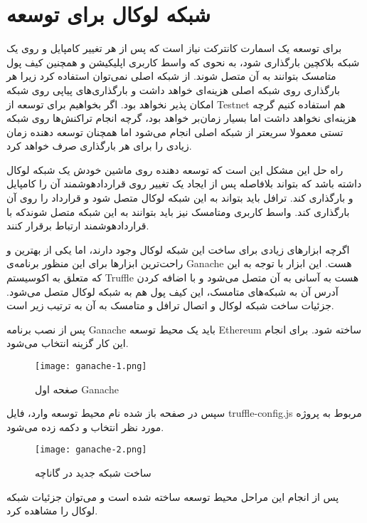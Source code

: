 \section{شبکه لوکال برای توسعه}
برای توسعه یک اسمارت کانترکت نیاز است که پس از هر تغییر کامپایل و روی یک شبکه بلاکچین بارگذاری شود، به نحوی که واسط کاربری اپلیکیشن و همچنین کیف پول متامسک بتوانند به آن متصل شوند.
از شبکه اصلی نمی‌توان استفاده کرد زیرا هر بارگذاری روی شبکه اصلی هزینه‌ای خواهد داشت و بارگذاری‌های پیاپی روی شبکه امکان پذیر نخواهد بود.
اگر بخواهیم برای توسعه از
\gls{Testnet}
هم استفاده کنیم گرچه هزینه‌ای نخواهد داشت اما بسیار زمان‌بر خواهد بود، گرچه انجام تراکنش‌ها روی شبکه تستی معمولا سریعتر از شبکه اصلی انجام می‌شود اما همچنان توسعه دهنده زمان زیادی را برای هر بارگذاری صرف خواهد کرد.

راه حل این مشکل این است که توسعه دهنده روی ماشین خودش یک شبکه لوکال داشته باشد که بتواند بلافاصله پس از ایجاد یک تغییر روی قراردادهوشمند آن را کامپایل و بارگذاری کند. ترافل باید بتواند به این شبکه لوکال متصل شود و قرارداد را روی آن بارگذاری کند. واسط کاربری ومتامسک نیز باید بتوانند به این شبکه متصل شوندکه با قراردادهوشمند ارتباط برقرار کنند.

اگرچه ابزارهای زیادی برای ساخت این شبکه لوکال وجود دارند، اما یکی از بهترین و راحت‌ترین ابزارها برای این منظور برنامه‌ی Ganache هست. این ابزار با توجه به این که متعلق به اکوسیستم Truffle هست به آسانی به آن متصل می‌شود و با اضافه کردن آدرس آن به شبکه‌های متامسک، این کیف پول هم به شبکه لوکال متصل می‌شود. جزئیات ساخت شبکه لوکال و اتصال ترافل و متامسک به آن به ترتیب زیر است.

پس از نصب برنامه Ganache باید یک محیط توسعه Ethereum ساخته شود. برای انجام این کار گزینه
انتخاب می‌شود.

\begin{figure}[ht]
\centerline{\texttt{[image: ganache-1.png]}}
\caption{صغحه اول Ganache}
\label{fig:ganache-1}
\end{figure}

سپس در صفحه باز شده نام محیط توسعه وارد،  فایل truffle-config.js مربوط به پروژه مورد نظر انتخاب و دکمه
زده می‌شود.

\begin{figure}[ht]
\centerline{\texttt{[image: ganache-2.png]}}
\caption{ساخت شبکه جدید در گاناچه}
\label{fig:ganache-2}
\end{figure}

پس از انجام این مراحل محیط توسعه ساخته شده است و می‌توان جزئیات شبکه لوکال را مشاهده کرد.


